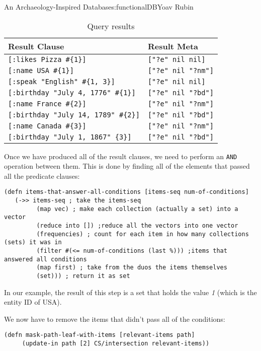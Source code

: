 \begin{aosachapter}{An Archaeology-Inspired Database}{s:functionalDB}{Yoav Rubin}
\begin{table}
\centering
{\footnotesize
{}
\begin{tabular}{ll}
\hline
\textbf{Result Clause} & \textbf{Result Meta} \\
\hline
\verb|[:likes Pizza #{1}]| & \verb|["?e" nil nil]| \\
\verb|[:name USA #{1}]| & \verb|["?e" nil "?nm"]| \\
\verb|[:speak "English" #{1, 3}]| & \verb|["?e" nil nil]| \\
\verb|[:birthday "July 4, 1776" #{1}]| & \verb|["?e" nil "?bd"]| \\
\verb|[:name France #{2}]| & \verb|["?e" nil "?nm"]| \\
\verb|[:birthday "July 14, 1789" #{2}]| & \verb|["?e" nil "?bd"]| \\
\verb|[:name Canada #{3}]| & \verb|["?e" nil "?nm"]| \\
\verb|[:birthday "July 1, 1867" {3}]| & \verb|["?e" nil "?bd"]| \\
\hline
\end{tabular}
}
\caption{Query results}
\label{500l.functionaldb.queryresults}
\end{table}

Once we have produced all of the result clauses, we need to perform an
\texttt{AND} operation between them. This is done by finding all of the
elements that passed all the predicate clauses:

\begin{verbatim}
(defn items-that-answer-all-conditions [items-seq num-of-conditions]
   (->> items-seq ; take the items-seq
         (map vec) ; make each collection (actually a set) into a vector
         (reduce into []) ;reduce all the vectors into one vector
         (frequencies) ; count for each item in how many collections (sets) it was in
         (filter #(<= num-of-conditions (last %))) ;items that answered all conditions
         (map first) ; take from the duos the items themselves
         (set))) ; return it as set
\end{verbatim}

In our example, the result of this step is a set that holds the value
\emph{1} (which is the entity ID of USA).

We now have to remove the items that didn't pass all of the conditions:

\begin{verbatim}
(defn mask-path-leaf-with-items [relevant-items path]
     (update-in path [2] CS/intersection relevant-items))
\end{verbatim}


\end{aosachapter}
